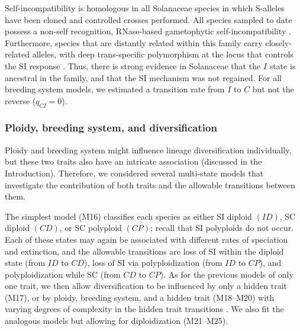 Self-incompatibility is homologous in all Solanaceae species in which S-alleles have been cloned and controlled crosses performed.
All species sampled to date possess a non-self recognition, RNase-based gametophytic self-incompatibility \citep[shared even with other euasterid families;][]{ramanauskas_2017}.
Furthermore, species that are distantly related within this family carry closely-related alleles, with deep trans-specific polymorphism at the locus that controls the SI response \citep{ioerger_1990, igic_2006}.
Thus, there is strong evidence in Solanaceae that the $I$ state is ancestral in the family, and that the SI mechanism was not regained.
For all breeding system models, we estimated a transition rate from $I$ to $C$  but not the reverse ($q_{CI}=0$).
%

\subsubsection{Ploidy, breeding system, and diversification}

Ploidy and breeding system might influence lineage diversification individually, but these two traits also have an intricate association (discussed in the Introduction).
Therefore, we considered several multi-state models that investigate the contribution of both traits and the allowable transitions between them.

The simplest model (M16) classifies each species as either SI diploid $(ID)$, SC diploid $(CD)$, or SC polyploid $(CP)$; recall that SI polyploids do not occur.
Each of these states may again be associated with different rates of speciation and extinction, and the allowable transitions are loss of SI within the diploid state (from $ID$ to $CD$), loss of SI via polyploidization (from $ID$ to $CP$), and polyploidization while SC (from $CD$ to $CP$).
As for the previous models of only one trait, we then allow diversification to be influenced by only a hidden trait (M17), or by ploidy, breeding system, and a hidden trait (M18--M20) with varying degrees of complexity in the hidden trait transitions
\citep[similar to][]{caetano_2018, huang_2018}. %
We also fit the analogous models but allowing for diploidization (M21--M25).

